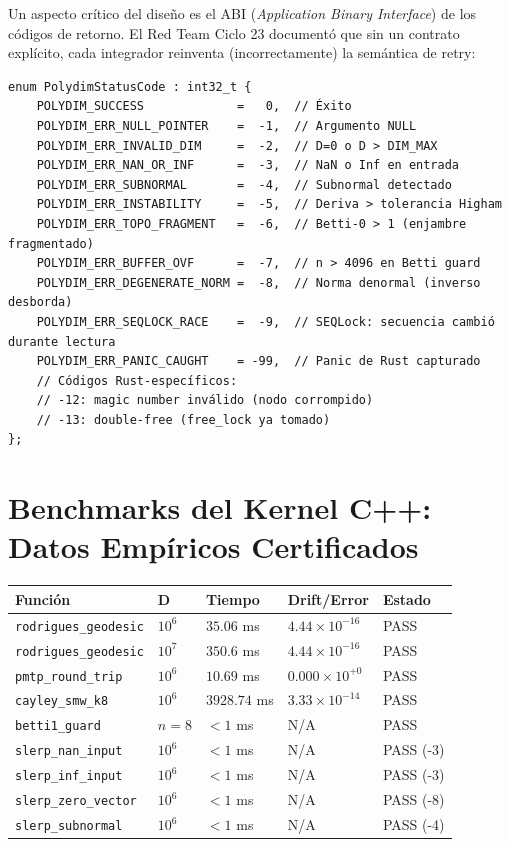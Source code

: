 Un aspecto crítico del diseño es el ABI (\textit{Application Binary Interface}) de
los códigos de retorno. El Red Team Ciclo 23 documentó que sin un contrato explícito,
cada integrador reinventa (incorrectamente) la semántica de retry:

\begin{verbatim}
enum PolydimStatusCode : int32_t {
    POLYDIM_SUCCESS             =   0,  // Éxito
    POLYDIM_ERR_NULL_POINTER    =  -1,  // Argumento NULL
    POLYDIM_ERR_INVALID_DIM     =  -2,  // D=0 o D > DIM_MAX
    POLYDIM_ERR_NAN_OR_INF      =  -3,  // NaN o Inf en entrada
    POLYDIM_ERR_SUBNORMAL       =  -4,  // Subnormal detectado
    POLYDIM_ERR_INSTABILITY     =  -5,  // Deriva > tolerancia Higham
    POLYDIM_ERR_TOPO_FRAGMENT   =  -6,  // Betti-0 > 1 (enjambre fragmentado)
    POLYDIM_ERR_BUFFER_OVF      =  -7,  // n > 4096 en Betti guard
    POLYDIM_ERR_DEGENERATE_NORM =  -8,  // Norma denormal (inverso desborda)
    POLYDIM_ERR_SEQLOCK_RACE    =  -9,  // SEQLock: secuencia cambió durante lectura
    POLYDIM_ERR_PANIC_CAUGHT    = -99,  // Panic de Rust capturado
    // Códigos Rust-específicos:
    // -12: magic number inválido (nodo corrompido)
    // -13: double-free (free_lock ya tomado)
};
\end{verbatim}

\section{Benchmarks del Kernel C++: Datos Empíricos Certificados}

\begin{tabular}{llll}
\hline
\textbf{Función} & \textbf{D} & \textbf{Tiempo} & \textbf{Drift/Error} & \textbf{Estado} \\
\hline
\texttt{rodrigues\_geodesic} & $10^6$ & $35.06$ ms & $4.44 \times 10^{-16}$ & \textcolor{polydimgreen}{PASS} \\
\texttt{rodrigues\_geodesic} & $10^7$ & $350.6$ ms & $4.44 \times 10^{-16}$ & \textcolor{polydimgreen}{PASS} \\
\texttt{pmtp\_round\_trip} & $10^6$ & $10.69$ ms & $0.000 \times 10^{+0}$ & \textcolor{polydimgreen}{PASS} \\
\texttt{cayley\_smw\_k8} & $10^6$ & $3928.74$ ms & $3.33 \times 10^{-14}$ & \textcolor{polydimgreen}{PASS} \\
\texttt{betti1\_guard} & $n=8$ & $< 1$ ms & N/A & \textcolor{polydimgreen}{PASS} \\
\texttt{slerp\_nan\_input} & $10^6$ & $< 1$ ms & N/A & \textcolor{polydimgreen}{PASS (-3)} \\
\texttt{slerp\_inf\_input} & $10^6$ & $< 1$ ms & N/A & \textcolor{polydimgreen}{PASS (-3)} \\
\texttt{slerp\_zero\_vector} & $10^6$ & $< 1$ ms & N/A & \textcolor{polydimgreen}{PASS (-8)} \\
\texttt{slerp\_subnormal} & $10^6$ & $< 1$ ms & N/A & \textcolor{polydimgreen}{PASS (-4)} \\
\hline


\end{tabular}

